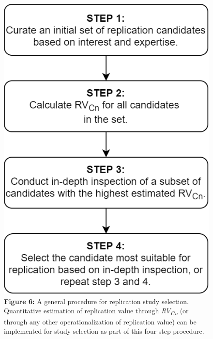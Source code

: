 \documentclass[
  english,
  jou,floatsintext]{apa6}
\begin{document}
\begin{figure}
\centering
\includegraphics{Figure_6.png}
\caption{\textbf{Figure 6:} A general procedure for replication study selection. Quantitative estimation of replication value through \emph{RV\textsubscript{Cn}} (or through any other operationalization of replication value) can be implemented for study selection as part of this four-step procedure. \label{fig:6}}
\end{figure}
\end{document}
